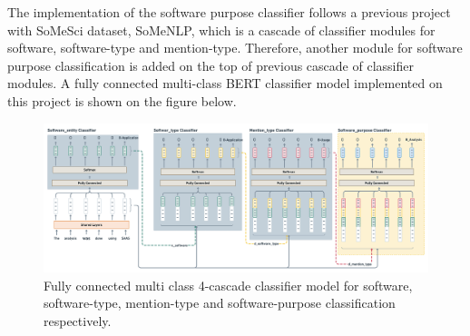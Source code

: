 The implementation of the software purpose classifier follows a previous project with SoMeSci dataset, SoMeNLP, which is a cascade of classifier modules for software, software-type and mention-type. Therefore, another module for software purpose classification is added on the top of previous cascade of classifier modules. A fully connected multi-class BERT classifier model implemented on this project is  shown on the figure below. 

\begin{figure}[htbp]
	\centering
	\includegraphics[width=1\textwidth]{4.graphics/figures/ch_5/fully_connected_model}
	\caption{Fully connected multi class 4-cascade classifier model for software, software-type, mention-type and software-purpose classification respectively.}
	\label{fig:chapter05:setup}
\end{figure}

 


